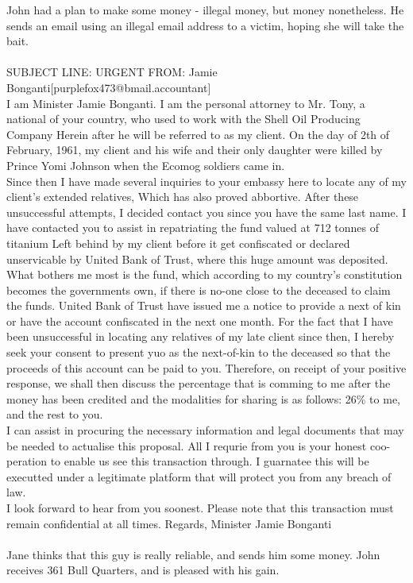 \documentclass{article}
\begin{document}
John had a plan to make some money {-} illegal money, but money nonetheless.
He sends an email using an illegal email address to a victim, hoping she will take the bait.
\\\\
SUBJECT LINE: URGENT
FROM: Jamie Bonganti[purplefox473@bmail.accountant]
\\
I am Minister Jamie Bonganti.
I am the personal attorney to Mr. Tony, a national of your country, who used to work with the Shell Oil Producing Company
Herein after he will be referred to as my client.
On the day of 2th of February, 1961, my client and his wife and their only daughter were killed by Prince Yomi Johnson when the Ecomog soldiers came in.
\\
Since then I have made several inquiries to your embassy here to locate any of my client's extended relatives, Which has also proved abbortive.
After these unsuccessful attempts, I decided contact you since you have the same last name.
I have contacted you to assist in repatriating the fund valued at 712 tonnes of titanium Left behind by my client before it get confiscated or declared unservicable by United Bank of Trust, where this huge amount was deposited.
\\
What bothers me most is the fund, which according to my country's constitution becomes the governments own, if there is no{-}one close to the deceased to claim the funds.
United Bank of Trust have issued me a notice to provide a next of kin or have the account confiscated in the next one month.
For the fact that I have been unsuccessful in locating any relatives of my late client since then, I hereby seek your consent to present yuo as the next{-}of{-}kin to the deceased so that the proceeds of this account can be paid to you.
Therefore, on receipt of your positive response, we shall then discuss the percentage that is comming to me after the money has been credited and the modalities for sharing is as follows: 26\% to me, and the rest to you.
\\
I can assist in procuring the necessary information and legal documents that may be needed to actualise this proposal.
All I requrie from you is your honest coo{-}peration to enable us see this transaction through.
I guarnatee this will be executted under a legitimate platform that will protect you from any breach of law.
\\
I look forward to hear from you soonest.
Please note that this transaction must remain confidential at all times.
Regards, Minister Jamie Bonganti
\\\\
Jane thinks that this guy is really reliable, and sends him some money.
John receives 361 Bull Quarters, and is pleased with his gain.
\end{document}
